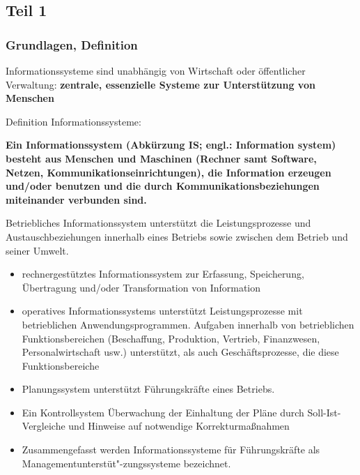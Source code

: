 \subsection{Teil 1}
\subsubsection{Grundlagen, Definition}
Informationssysteme sind unabhängig von Wirtschaft oder öffentlicher Verwaltung:
\textbf{zentrale, essenzielle Systeme zur Unterstützung von Menschen}
\par
Definition Informationssysteme:
\par
\textbf{Ein Informationssystem (Abkürzung IS; engl.: Information system) besteht aus Menschen und Maschinen (Rechner samt Software, Netzen, Kommunikationseinrichtungen), die Information erzeugen und/oder benutzen und die durch Kommunikationsbeziehungen miteinander verbunden sind.}
\par
Betriebliches Informationssystem unterstützt die Leistungsprozesse und Austauschbeziehungen innerhalb eines Betriebs sowie zwischen dem Betrieb und seiner Umwelt.
\par
\begin{itemize}
  \item rechnergestütztes Informationssystem zur Erfassung, Speicherung, Übertragung und/oder Transformation von Information
  \item operatives Informationssystems unterstützt Leistungsprozesse mit betrieblichen Anwendungsprogrammen. Aufgaben innerhalb von betrieblichen Funktionsbereichen (Beschaffung, Produktion, Vertrieb, Finanzwesen, Personalwirtschaft usw.) unterstützt, als auch Geschäftsprozesse, die diese Funktionsbereiche 
  \item Planungssystem unterstützt Führungskräfte eines Betriebs.
  \item Ein Kontrollsystem Überwachung der Einhaltung der Pläne durch Soll-Ist-Vergleiche und Hinweise auf notwendige Korrekturmaßnahmen
  \item Zusammengefasst werden Informationssysteme für Führungskräfte als Managementunterstüt"-zungssysteme bezeichnet.
\end{itemize}
\par

